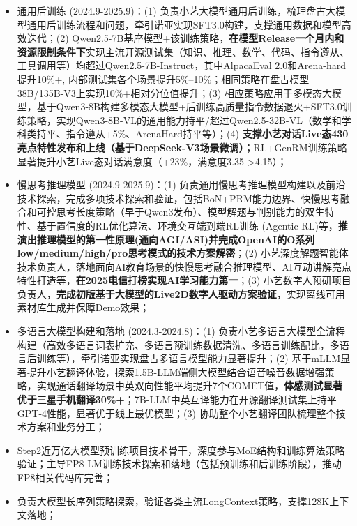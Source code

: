\documentclass{resume}
\begin{document}
\begin{itemize}
\item 通用后训练 (2024.9-2025.9)：(1) 负责小艺大模型通用后训练，梳理盘古大模型通用后训练流程和问题，牵引诺亚实现SFT3.0构建，支撑通用数据和模型高效迭代；(2) Qwen2.5-7B基座模型+该训练策略，\textbf{在模型Release一个月内和资源限制条件下}实现主流开源测试集（知识、推理、数学、代码、指令遵从、工具调用等）均超过Qwen2.5-7B-Instruct，其中AlpacaEval 2.0和Arena-hard提升10\%+, 内部测试集各个场景提升5\%--10\%；相同策略在盘古模型38B/135B-V3上实现10\%+相对分位值提升；(3) 相应策略应用于多模态大模型，基于Qwen3-8B构建多模态大模型+后训练高质量指令数据退火+SFT3.0训练策略，实现Qwen3-8B-VL的通用能力持平/超过Qwen2.5-32B-VL（数学和学科类持平、指令遵从+5\%、ArenaHard持平等）；(4) \textbf{支撑小艺对话Live态430亮点特性发布和上线（基于DeepSeek-V3场景微调）}；RL+GenRM训练策略显著提升小艺Live态对话满意度（+23\%，满意度3.35->4.15）；
\item 慢思考推理模型 (2024.9-2025.9)：(1) 负责通用慢思考推理模型构建以及前沿技术探索，完成多项技术探索和验证，包括BoN+PRM能力边界、快慢思考融合和可控思考长度策略（早于Qwen3发布）、模型解题与判别能力的双生特性、基于置信度的RL优化算法、环境交互端到端RL训练 (Agentic RL)等，\textbf{推演出推理模型的第一性原理(通向AGI/ASI)并完成OpenAI的O系列low/medium/high/pro思考模式的技术方案解密}；(2) 小艺深度解题智能体技术负责人，落地面向AI教育场景的快慢思考融合推理模型、AI互动讲解亮点特性打造等，\textbf{在2025电信打榜实现AI学习能力第一}；(3) 小艺数字人预研项目负责人，\textbf{完成初版基于大模型的Live2D数字人驱动方案验证}，实现离线可用素材库生成并保障Demo效果；
\item 多语言大模型构建和落地 (2024.3-2024.8)：(1) 负责小艺多语言大模型全流程构建（高效多语言词表扩充、多语言预训练数据清洗、多语言训练配比，多语言后训练等），牵引诺亚实现盘古多语言模型能力显著提升；(2) 基于mLLM显著提升小艺翻译体验，探索1.5B-LLM端侧大模型结合语音噪音数据增强策略，实现通话翻译场景中英双向性能平均提升7个COMET值，\textbf{体感测试显著优于三星手机翻译30\%+}；7B-LLM中英互译能力在开源翻译测试集上持平GPT-4性能，显著优于线上最优模型；(3) 协助整个小艺翻译团队梳理整个技术方案和业务分工；
\end{itemize}

\begin{itemize}
\item Step2近万亿大模型预训练项目技术骨干，深度参与MoE结构和训练算法策略验证；主导FP8-LM训练技术探索和落地（包括预训练和后训练阶段），推动FP8相关代码库完善；
\item 负责大模型长序列策略探索，验证各类主流LongContext策略，支撑128K上下文落地；
\end{itemize}
\end{document}
